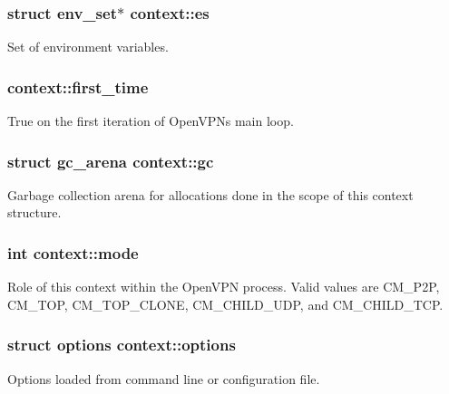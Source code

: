 \subsubsection[{es}]{\setlength{\rightskip}{0pt plus 5cm}struct {\bf env\+\_\+set}$\ast$ context\+::es}\label{structcontext_a9b3f2f6a6281c99c8c1e26598875d5ab}
Set of environment variables. \hypertarget{structcontext_a4562924ba33d42c7c84399bc61e5634b}{}
\subsubsection[{first\+\_\+time}]{ context\+::first\+\_\+time}\label{structcontext_a4562924ba33d42c7c84399bc61e5634b}
True on the first iteration of Open\+V\+P\+N\textquotesingle{}s main loop. \hypertarget{structcontext_ad2b1fffbd57d0ba779aa9b5ef8a9c78d}{}
\subsubsection[{gc}]{\setlength{\rightskip}{0pt plus 5cm}struct {\bf gc\+\_\+arena} context\+::gc}\label{structcontext_ad2b1fffbd57d0ba779aa9b5ef8a9c78d}
Garbage collection arena for allocations done in the scope of this context structure. \hypertarget{structcontext_a05c5cc1b7bab3bf8fc5b1e23b38299f4}{}
\subsubsection[{mode}]{\setlength{\rightskip}{0pt plus 5cm}int context\+::mode}\label{structcontext_a05c5cc1b7bab3bf8fc5b1e23b38299f4}
Role of this context within the Open\+V\+P\+N process. Valid values are {\ttfamily C\+M\+\_\+\+P2\+P}, {\ttfamily C\+M\+\_\+\+T\+O\+P}, {\ttfamily C\+M\+\_\+\+T\+O\+P\+\_\+\+C\+L\+O\+N\+E}, {\ttfamily C\+M\+\_\+\+C\+H\+I\+L\+D\+\_\+\+U\+D\+P}, and {\ttfamily C\+M\+\_\+\+C\+H\+I\+L\+D\+\_\+\+T\+C\+P}. \hypertarget{structcontext_aa9a5e593e669fc88b8b1c7a9d69c5df1}{}
\subsubsection[{options}]{\setlength{\rightskip}{0pt plus 5cm}struct {\bf options} context\+::options}\label{structcontext_aa9a5e593e669fc88b8b1c7a9d69c5df1}
Options loaded from command line or configuration file. \hypertarget{structcontext_af52fc5d2e241fbee78d2216e9ff7ed72}{}
